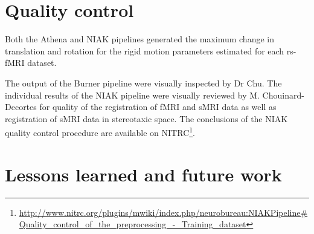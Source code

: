 \documentclass[preprint,12pt,3p]{elsarticle}
\begin{document}
\begin{itemize}
\section{Quality control}

Both the Athena and NIAK pipelines generated the maximum change in translation and rotation for the rigid motion parameters estimated for each rs-fMRI dataset. 

 


The output of the Burner pipeline were visually inspected by Dr Chu. The individual results of the NIAK pipeline were visually reviewed by M. Chouinard-Decortes for quality of the registration of fMRI and sMRI data as well as registration of sMRI data in stereotaxic space. The conclusions of the NIAK quality control procedure are available on NITRC\footnote{\url{http://www.nitrc.org/plugins/mwiki/index.php/neurobureau:NIAKPipeline#Quality_control_of_the_preprocessing_-_Training_dataset}}.

\section{Lessons learned and future work}


\end{itemize}
\end{document}
